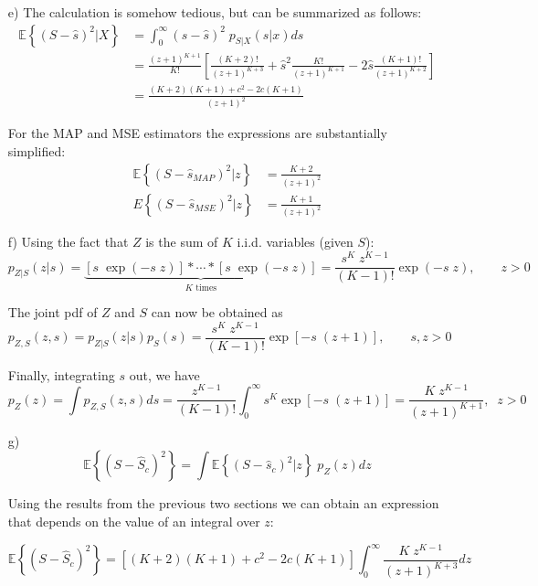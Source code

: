 \begin{solution}
\begin{itemize}
    \item[e)]
    The calculation is somehow tedious, but can be summarized as follows:
    \begin{align}
        \mathbb{E}\left\{ (S-\hat{s})^2|X\right\} & = \int_0^\infty (s-\hat{s})^2 \; p_{S|X}(s|x) ds \nonumber \\
        & = \frac{(z+1)^{K+1}}{K!}\left[ \frac{(K+2) !}{(z+1)^{K+3}} + \hat{s}^2 \frac{K!}{(z+1)^{K+1}} - 2\hat{s} \frac{(K+1) !}{(z+1)^{K+2}}\right] \nonumber \\
        & = \frac{(K+2)(K+1) + c^2 - 2 c(K+1)}{(z+1)^2} \nonumber
    \end{align}
    
    For the MAP and MSE estimators the expressions are substantially simplified:
    \begin{align}
        \mathbb{E}\left\{ (S-\hat{s}_{MAP})^2|z\right\} & = \displaystyle\frac{K+2}{(z+1)^2} \nonumber \\
        {E}\left\{(S-\hat{s}_{MSE})^2|z\right\} & = \displaystyle\frac{K+1}{(z+1)^2} \nonumber 
    \end{align}
    
    \item[f)]
    Using the fact that $Z$ is the sum of $K$ i.i.d. variables (given $S$):
    $$p_{Z|S}(z|s) = \underbrace{[s\; \exp(-s\;z)]\ast \cdots \ast[s\; \exp(-s\;z)]}_\text{$K$ times} = \frac{s^{K}\;z^{K-1}}{(K-1)!} \exp(-s \; z), \qquad z>0$$
    
    The joint pdf of $Z$ and $S$ can now be obtained as
    $$p_{Z,S}(z,s) = p_{Z|S}(z|s)p_S(s) = \frac{s^{K}\;z^{K-1}}{(K-1) !} \exp[-s \; (z+1)], \qquad s,z>0$$
    
    Finally, integrating $s$ out, we have
    $$p_Z(z) = \int p_{Z,S}(z,s) ds = \frac{z^{K-1}}{(K-1) !}\int_0^\infty s^K \exp[-s \; (z+1)] = \frac{K\;z^{K-1}}{(z+1)^{K+1}},\;\; z>0$$
    
    \item[g)]
    $$\mathbb{E}\left\{ (S-\hat{S}_c)^2\right\} = \int \mathbb{E}\left\{ (S-\hat{s}_c)^2|z\right\} \; p_Z(z) dz$$
    
    Using the results from the previous two sections we can obtain an expression that depends on the value of an integral over $z$:
    
    $$\mathbb{E}\left\{ (S-\hat{S}_c)^2\right\} = \left[(K+2)(K+1) + c^2 - 2 c(K+1)\right] \int_0^\infty \frac{K\;z^{K-1}}{(z+1)^{K+3}} dz$$
    
    

\end{itemize}
\end{solution}
